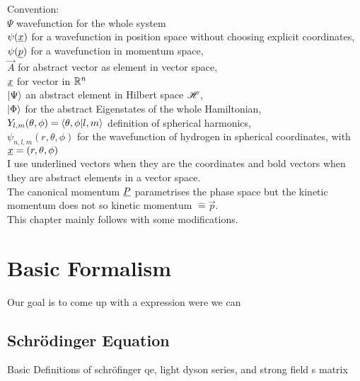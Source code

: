 Convention: \\
$\Psi$ wavefunction for the whole system  \\
$\psi(\underline{x})$ for a wavefunction in position space without choosing explicit coordinates, \\
$\psi(\underline{p})$  for a wavefunction in momentum space, \\
$\vec{A}$ for abstract vector as element in vector space, \\
$\underline{x}$ for vector in $\mathbb{R}^n$ \\
$\ket{\Psi}$ an abstract element in Hilbert space $\mathscr{H}$, \\
$\ket{\Phi}$ for the abstract Eigenstates of the whole Hamiltonian, \\
$Y_{l, m}(\theta, \phi) = \braket{\theta, \phi | l, m}$ definition of spherical harmonics, \\
$\psi_{n, l, m}(r, \theta, \phi)$ for the wavefunction of hydrogen in spherical coordinates, with $\underline{x}=(r, \theta, \phi)$ \\
I use underlined vectors when they are the coordinates and bold vectors when they are abstract elements in a vector space. \\
The canonical momentum $\underline{P}$ parametrises the phase space but the kinetic momentum does not so kinetic momentum $\hat{=} \vec{p}$.\\


This chapter mainly follows \cite{Ivanov20012005} with some modifications.



\section{Basic Formalism}
Our goal is to come up with a expression were we can 


\subsection{Schrödinger Equation}

Basic Definitions of schröfinger qe, light dyson series, and strong field s matrix

